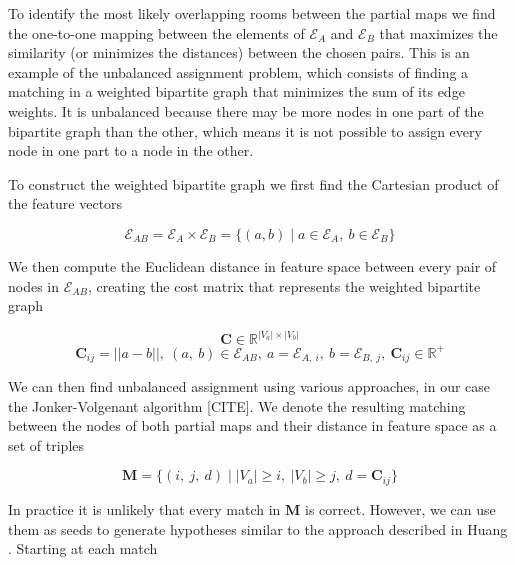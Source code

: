 To identify the most likely overlapping rooms between the partial maps we find the one-to-one mapping between the elements of \(\mathcal{E}_A\) and \(\mathcal{E}_B\) that maximizes the similarity (or minimizes the distances) between the chosen pairs. This is an example of the unbalanced assignment problem, which consists of finding a matching in a weighted bipartite graph that minimizes the sum of its edge weights. It is unbalanced because there may be more nodes in one part of the bipartite graph than the other, which means it is not possible to assign every node in one part to a node in the other. 

To construct the weighted bipartite graph we first find the Cartesian product of the feature vectors 

\begin{equation}
    \label{eq:E_ab}
    \mathcal{E}_{AB} = \mathcal{E}_A \times \mathcal{E}_B = \{(a,b) \mid a \in \mathcal{E}_A,\ b \in \mathcal{E}_B\}
\end{equation}

We then compute the Euclidean distance in feature space between every pair of nodes in \(\mathcal{E}_{AB}\), creating the cost matrix that represents the weighted bipartite graph 

\begin{equation}
    \label{eq:C}
    \mathbf{C} \in \mathbb{R}^{|V_a| \times |V_b|}
\end{equation}
\begin{equation}
    \label{eq:C}
    \mathbf{C}_{ij} = ||a - b||,\ (a,\ b) \in \mathcal{E}_{AB},\ a = \mathcal{E}_{A,\ i},\ b = \mathcal{E}_{B,\ j},\ \mathbf{C}_{ij} \in \mathbb{R}^+
\end{equation}

We can then find unbalanced assignment using various approaches, in our case the Jonker-Volgenant algorithm [CITE]. We denote the resulting matching between the nodes of both partial maps and their distance in feature space as a set of triples 

\begin{equation}
    \label{eq:M}
    \mathbf{M} = \{(i,\ j,\ d) \mid  |V_a| \geq i,\ |V_b|\geq j,\ d = \mathbf{C}_{ij}\}
\end{equation}

In practice it is unlikely that every match in \(\mathbf{M}\) is correct. However, we can use them as seeds to generate hypotheses similar to the approach described in Huang \citep{huang_topological_2005}. Starting at each match 

